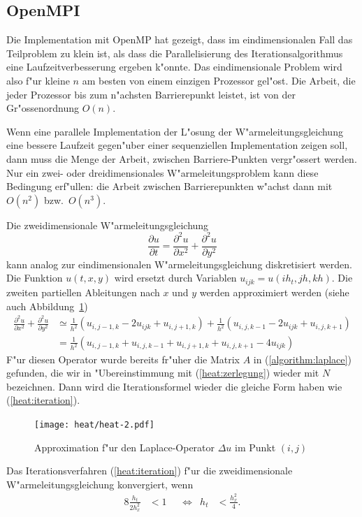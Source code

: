 \subsection{OpenMPI}
Die Implementation mit OpenMP hat gezeigt, dass im eindimensionalen Fall
das Teilproblem zu klein ist, als dass die Parallelisierung des
Iterationsalgorithmus eine Laufzeitverbesserung ergeben k"onnte.
Das eindimensionale Problem wird also f"ur kleine $n$ am besten von einem
einzigen Prozessor gel"ost. 
Die Arbeit, die jeder Prozessor bis zum n"achsten Barrierepunkt
leistet, ist von der Gr"ossenordnung $O(n)$. 

Wenn eine parallele Implementation der L"osung der W"armeleitungsgleichung
eine bessere Laufzeit gegen"uber einer sequenziellen Implementation 
zeigen soll, dann muss die Menge der Arbeit, zwischen Barriere-Punkten
vergr"ossert werden.
Nur ein zwei- oder dreidimensionales W"armeleitungsproblem kann diese
Bedingung erf"ullen:
die Arbeit zwischen Barrierepunkten w"achst dann mit $O(n^2)$ bzw.~$O(n^3)$.

Die zweidimensionale W"armeleitungsgleichung
\[
\frac{\partial u}{\partial t}
=
\frac{\partial^2 u}{\partial x^2}
+
\frac{\partial^2 u}{\partial y^2}
\]
kann analog zur eindimensionalen W"armeleitungsgleichung diskretisiert
werden.
Die Funktion $u(t,x,y)$ wird ersetzt durch Variablen $u_{ijk}=u(ih_t,jh,kh)$.
Die zweiten partiellen Ableitungen nach $x$ und $y$ werden approximiert
werden (siehe auch Abbildung~\ref{heat:diskretisation2})
\begin{align*}
\frac{\partial^2u}{\partial x^2}
+
\frac{\partial^2u}{\partial y^2}
&
\simeq
\frac1{h^2}(
u_{i,j-1,k}-2u_{ijk}+u_{i,j+1,k}
)
+
\frac1{h^2}(
u_{i,j,k-1}-2u_{ijk}+u_{i,j,k+1}
)
\\
&=\frac1{h^2}(
u_{i,j-1,k}
+
u_{i,j,k-1}
+
u_{i,j+1,k}
+
u_{i,j,k+1}
-
4u_{ijk}
)
\end{align*}
F"ur diesen Operator wurde bereits fr"uher die Matrix $A$ in
(\ref{algorithm:laplace}) gefunden, die wir in "Ubereinstimmung mit
(\ref{heat:zerlegung}) wieder mit $N$ bezeichnen.
Dann wird die Iterationsformel wieder die gleiche Form haben wie
(\ref{heat:iteration}).
\begin{figure}
\begin{center}
\texttt{[image: heat/heat-2.pdf]}
\end{center}
\caption{Approximation f"ur den Laplace-Operator $\Delta u$ im Punkt $(i,j)$
\label{heat:diskretisation2}}
\end{figure}

\begin{satz}
Das Iterationsverfahren (\ref{heat:iteration}) f"ur die zweidimensionale
W"armeleitungsgleichung konvergiert, wenn 
\begin{align*}
8\frac{h_t}{2h_x^2}&<1
&&\Leftrightarrow
&
h_t&<\frac{h_x^2}{4}.
\end{align*}
\end{satz}


